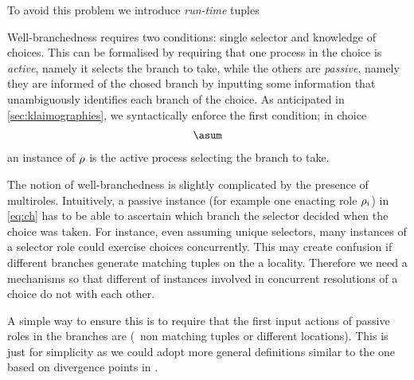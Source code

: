\hsl

To avoid this problem we introduce \emph{run-time} tuples

Well-branchedness requires two conditions: single selector and knowledge of 
choices.
%
This can be formalised by requiring that one process in the choice is
\emph{active}, namely it selects the branch to take, while the others
are \emph{passive}, namely they are informed of the chosed branch by
inputting some information that unambiguously identifies each branch
of the choice.
%
As anticipated in \cref{sec:klaimographies}, we syntactically enforce
the first condition; in choice
\begin{align}
  \asum\label{eq:ch}
\end{align}
an instance of $\rho$ is the active process selecting the branch to take.


The notion of well-branchedness is slightly complicated by the
presence of multiroles.
%
Intuitively, a passive instance (for example one enacting role
$\rho_i$) in \eqref{eq:ch} has to be able to ascertain which branch
the selector decided when the choice was taken.
%
For instance, even assuming unique selectors, many instances of a
selector role could exercise choices concurrently.
%
This may create confusion if different branches generate matching
tuples on the a locality.
%
Therefore we need a mechanisms so that different  of
instances involved in concurrent resolutions of a choice do not
 with each other.



A simple way to ensure this is to require that the first input actions
of passive roles in the branches are  (\ie\ non matching
tuples or different locations).
%
This is just for simplicity as we could adopt more general definitions
similar to the one based on divergence points in \cite{gt16,gt17}.

